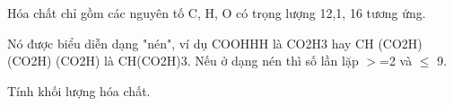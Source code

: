Hóa chất chỉ gồm các nguyên tố C, H, O có trọng lượng 12,1, 16 tương ứng.  

   Nó được biểu diễn dạng "nén", ví dụ COOHHH là CO2H3  hay CH (CO2H) (CO2H) (CO2H) là CH(CO2H)3. Nếu ở dạng nén thì số lần lặp $>$=2 và  $\le$ 9.  

   Tính khối lượng hóa chất.